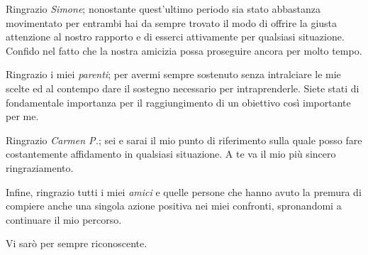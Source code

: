 Ringrazio \emph{Simone}; nonostante quest'ultimo periodo sia stato abbastanza movimentato per entrambi hai da sempre trovato il modo di offrire la giusta attenzione al nostro rapporto e di esserci attivamente per qualsiasi situazione. Confido nel fatto che la nostra amicizia possa proseguire ancora per molto tempo.

Ringrazio i miei \emph{parenti}; per avermi sempre sostenuto senza intralciare le mie scelte ed al contempo dare il sostegno necessario per intraprenderle. Siete stati di fondamentale importanza per il raggiungimento di un obiettivo così importante per me.

Ringrazio \emph{Carmen P.}; sei e sarai il mio punto di riferimento sulla quale posso fare costantemente affidamento in qualsiasi situazione. A te va il mio più sincero ringraziamento.

Infine, ringrazio tutti i miei \emph{amici} e quelle persone che hanno avuto la premura di compiere anche una singola azione positiva nei miei confronti, spronandomi a continuare il mio percorso. 

Vi sarò per sempre riconoscente.
